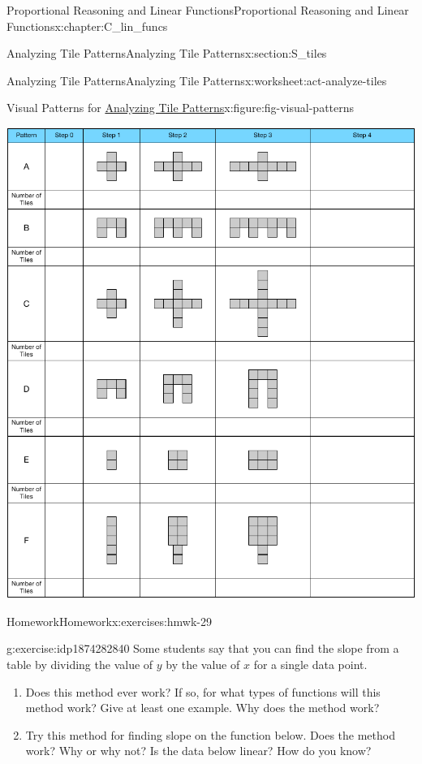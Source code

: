 \documentclass[oneside,10pt,]{book}
\numberwithin{equation}{chapter}
\begin{document}
\begin{chapterptx}{Proportional Reasoning and Linear Functions}{}{Proportional Reasoning and Linear Functions}{}{}{x:chapter:C_lin_funcs}
\begin{sectionptx}{Analyzing Tile Patterns}{}{Analyzing Tile Patterns}{}{}{x:section:S_tiles}
\begin{worksheet-subsection}{Analyzing Tile Patterns}{}{Analyzing Tile Patterns}{}{}{x:worksheet:act-analyze-tiles}
\begin{figureptx}{Visual Patterns for \hyperref[x:worksheet:act-analyze-tiles]{Analyzing Tile Patterns}}{x:figure:fig-visual-patterns}{}
\begin{image}{0}{1}{0}
\includegraphics[width=\linewidth]{external/visual-patterns.pdf}
\end{image}%
\tcblower
\end{figureptx}%
\end{worksheet-subsection}
\restoregeometry
%
%
\typeout{************************************************}
\typeout{************************************************}
%
\begin{exercises-subsection}{Homework}{}{Homework}{}{}{x:exercises:hmwk-29}
\begin{divisionexercise}{1}{}{}{g:exercise:idp1874282840}%
Some students say that you can find the slope from a table by dividing the value of \(y\) by the value of \(x\) for a single data point.%
\begin{enumerate}[font=\bfseries,label=(\alph*),ref=\alph*]
\item{}Does this method ever work? If so, for what types of functions will this method work? Give at least one example. Why does the method work?%
\item{}Try this method for finding slope on the function below. Does the method work? Why or why not? Is the data below linear? How do you know?%

\end{enumerate}
\end{divisionexercise}
\end{exercises-subsection}
\end{sectionptx}
\end{chapterptx}
\end{document}

